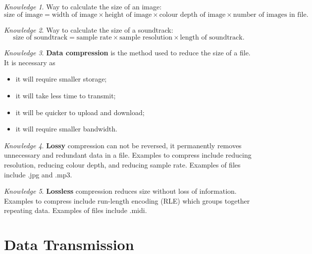\documentclass[8pt]{article}
\theoremstyle{remark}
\newtheorem{knowledge}{Knowledge}[subsection]
\begin{document}
        \begin{knowledge}
            Way to calculate the size of an image:
            \[
                \text{size of image} = \text{width of image} \times \text{height of image} \times \text{colour depth of image} \times \text{number of images in file}.
            \]
        \end{knowledge}

        \begin{knowledge}
            Way to calculate the size of a soundtrack:
            \[
                \text{size of soundtrack} = \text{sample rate} \times \text{sample resolution} \times \text{length of soundtrack}.
            \]
        \end{knowledge}

        \begin{knowledge}
            \textbf{Data compression} is the method used to reduce the size of a file. It is necessary as
            \begin{itemize}
                \item it will require smaller storage;
                \item it will take less time to transmit;
                \item it will be quicker to upload and download;
                \item it will require smaller bandwidth.
            \end{itemize}
        \end{knowledge}

        \begin{knowledge}
            \textbf{Lossy} compression can not be reversed, it permanently removes unnecessary and redundant data in a file. Examples to compress include reducing resolution, reducing colour depth, and reducing sample rate. Examples of files include .jpg and .mp3.
        \end{knowledge}

        \begin{knowledge}
            \textbf{Lossless} compression reduces size without loss of information. Examples to compress include run-length encoding (RLE) which groups together repeating data. Examples of files include .midi.
        \end{knowledge}

    \section{Data Transmission}
\end{document}
